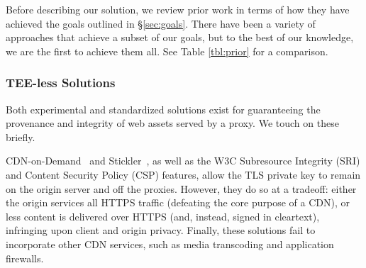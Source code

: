 
Before describing our solution, we review prior work in terms of how they have
achieved the goals outlined in \S\ref{sec:goals}.  There have been a variety of
approaches that achieve a subset of our goals, but to the best of our
knowledge, we are the first to achieve them all.  See Table \ref{tbl:prior} for
a comparison.

\subsubsection{TEE-less Solutions}

Both experimental and standardized solutions exist for guaranteeing the
provenance and integrity of web assets served by a proxy.
We touch on these briefly.
%

CDN-on-Demand~\cite{cdn-on-demand} and Stickler~\cite{stickler}, as well as the
W3C Subresource Integrity (SRI) and Content Security Policy (CSP) features,
allow the TLS private key to remain on the origin server and off the proxies.
However, they do so at a tradeoff: either the origin services all HTTPS traffic
(defeating the core purpose of a CDN), or less content is delivered over HTTPS
(and, instead, signed in cleartext), infringing upon client and origin privacy.
%
Finally, these solutions fail to incorporate other CDN services, such as media
transcoding and application firewalls.

